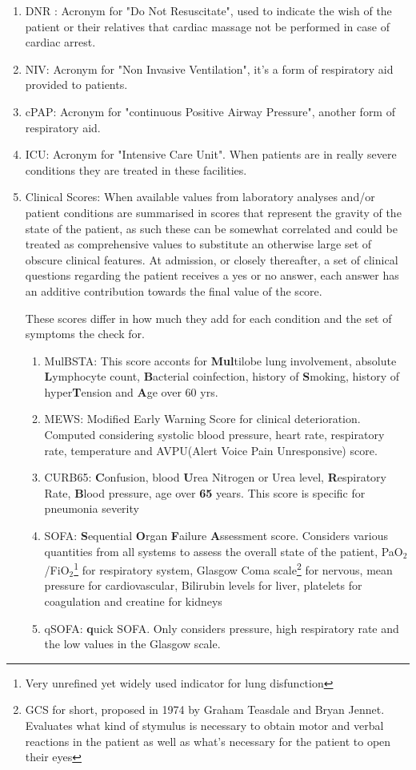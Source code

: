 \begin{enumerate}\label{clinical_features}
\item DNR : Acronym for "Do Not Resuscitate", used to indicate the wish of the patient or their relatives that cardiac massage not be performed in case of cardiac arrest.
\item NIV: Acronym for "Non Invasive Ventilation", it's a form of respiratory aid provided to patients.
\item cPAP: Acronym for  "continuous Positive Airway Pressure", another form of respiratory aid.
\item ICU: Acronym for "Intensive Care Unit". When patients are in really severe conditions they are treated in these facilities.
\item Clinical Scores: When available values from laboratory analyses and/or patient conditions are summarised in scores that represent the gravity of the state of the patient, as such these can be somewhat correlated and could be treated as comprehensive values to substitute an otherwise large set of obscure clinical features. At admission, or closely thereafter, a set of clinical questions regarding the patient receives a yes or no answer, each answer has an additive contribution towards the final value of the score.

These scores differ in how much they add for each condition and the set of symptoms the check for.
	\begin{enumerate}
		\item MulBSTA: This score acconts for \textbf{Mul}tilobe lung involvement, absolute \textbf{L}ymphocyte count, \textbf{B}acterial coinfection, history of \textbf{S}moking, history of hyper\textbf{T}ension and \textbf{A}ge over 60 yrs. \cite{MulBSTA}
		\item MEWS: Modified Early Warning Score for clinical deterioration. Computed considering systolic blood pressure, heart rate, respiratory rate, temperature and AVPU(Alert Voice Pain Unresponsive) score. \cite{MEWS}
		\item CURB65: \textbf{C}onfusion, blood \textbf{U}rea Nitrogen or Urea level, \textbf{R}espiratory Rate, \textbf{B}lood pressure, age over \textbf{65} years. This score is specific for pneumonia severity \cite{CURB65}
		\item SOFA:  \textbf{S}equential  \textbf{O}rgan  \textbf{F}ailure  \textbf{A}ssessment score. Considers various quantities from all systems to assess the overall state of the patient, PaO$_2$/FiO$_2$\footnote{Very unrefined yet widely used indicator for lung disfunction} for respiratory system, Glasgow Coma scale\footnote{GCS for short, proposed in 1974 by Graham Teasdale and Bryan Jennet. Evaluates what kind of stymulus is necessary to obtain motor and verbal reactions in the patient as well as what's necessary for the patient to open their eyes} for nervous, mean pressure for cardiovascular, Bilirubin levels for liver, platelets for coagulation and creatine for kidneys \cite{SOFA}
		\item qSOFA:  \textbf{q}uick SOFA. Only considers pressure, high respiratory rate and the low values in the Glasgow scale.
	\end{enumerate}
\end{enumerate}


